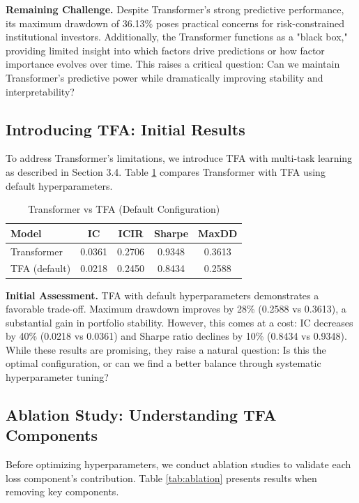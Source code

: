 \documentclass[12pt]{article}
\begin{document}
\textbf{Remaining Challenge.} Despite Transformer's strong predictive performance, its maximum drawdown of 36.13\% poses practical concerns for risk-constrained institutional investors. Additionally, the Transformer functions as a "black box," providing limited insight into which factors drive predictions or how factor importance evolves over time. This raises a critical question: Can we maintain Transformer's predictive power while dramatically improving stability and interpretability?

\subsection{Introducing TFA: Initial Results}

To address Transformer's limitations, we introduce TFA with multi-task learning as described in Section 3.4. Table \ref{tab:tfa_initial} compares Transformer with TFA using default hyperparameters.

\begin{table}[ht!]
\centering
\caption{Transformer vs TFA (Default Configuration)}
\label{tab:tfa_initial}
\begin{tabular}{lcccc}
\toprule
\textbf{Model} & \textbf{IC} & \textbf{ICIR} & \textbf{Sharpe} & \textbf{MaxDD} \\
\midrule
Transformer & 0.0361 & 0.2706 & 0.9348 & 0.3613 \\
TFA (default) & 0.0218 & 0.2450 & 0.8434 & 0.2588 \\
\bottomrule
\end{tabular}
\end{table}

\textbf{Initial Assessment.} TFA with default hyperparameters demonstrates a favorable trade-off. Maximum drawdown improves by 28\% (0.2588 vs 0.3613), a substantial gain in portfolio stability. However, this comes at a cost: IC decreases by 40\% (0.0218 vs 0.0361) and Sharpe ratio declines by 10\% (0.8434 vs 0.9348). While these results are promising, they raise a natural question: Is this the optimal configuration, or can we find a better balance through systematic hyperparameter tuning?

\subsection{Ablation Study: Understanding TFA Components}

Before optimizing hyperparameters, we conduct ablation studies to validate each loss component's contribution. Table \ref{tab:ablation} presents results when removing key components.
\end{document}
